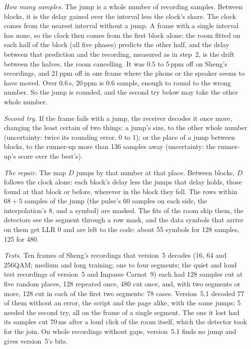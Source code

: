 \documentclass[11pt,a4paper]{article}
\theoremstyle{remark}
\begin{document}
\emph{How many samples.} The jump is a whole number of recording samples. Between blocks, it is the delay gained over the interval less the clock's share. The clock comes from the nearest interval without a jump. A frame with a single interval has none, so the clock then comes from the first block alone: the room fitted on each half of the block (all five phases) predicts the other half, and the delay between that prediction and the recording, measured as in step~2, is the drift between the halves, the room cancelling. It was $0.5$ to 5\,ppm off on Sheng's recordings, and 21\,ppm off in one frame where the phone or the speaker seems to have moved. Over $0.6$\,s, 20\,ppm is $0.6$ sample, enough to round to the wrong number. So the jump is rounded, and the second try below may take the other whole number.

\emph{Second try.} If the frame fails with a jump, the receiver decodes it once more, changing the least certain of two things: a jump's size, to the other whole number (uncertainty: twice its rounding error, 0 to 1); or the place of a jump between blocks, to the runner-up more than 136 samples away (uncertainty: the runner-up's score over the best's).

\emph{The repair.} The map $D$ jumps by that number at that place. Between blocks, $D$ follows the clock alone: each block's delay less the jumps that delay holds, those found at that block or before, wherever in the block they fell. The rows within $68 + 5$ samples of the jump (the pulse's 60 samples on each side, the interpolation's 8, and a symbol) are masked. The fits of the room skip them, the detectors see the segment through a row mask, and the data symbols that arrive on them get LLR 0 and are left to the code: about 55 symbols for 128 samples, 125 for 480.

\emph{Tests.} Ten frames of Sheng's recordings that version~5 decodes (16, 64 and 256QAM; medium and long training; one to four segments; the quiet and loud test recordings of version~5 and Impasse Carnot~9) each had 128 samples cut at five random places, 128 repeated once, 480 cut once, and, with two segments or more, 128 cut in each of the first two segments: 78 cases. Version~5.1 decoded 77 of them without an error, the script and the page alike, with the same jumps; 5 needed the second try, all on the frame of a single segment. The one it lost had its samples cut 70\,ms after a loud click of the room itself, which the detector took for the join. On whole recordings without gaps, version~5.1 finds no jump and gives version~5's bits.
\end{document}
